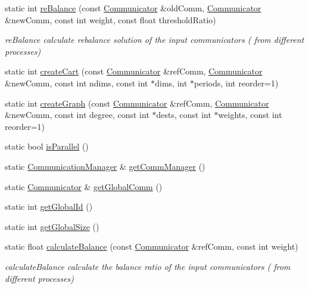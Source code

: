 \begin{DoxyCompactItemize}
static int \hyperlink{classHSF_1_1COMM_aaaf021a10daa5fbfa85102953a0d8f1c}{reBalance} (const \hyperlink{classHSF_1_1Communicator}{Communicator} \&oldComm, \hyperlink{classHSF_1_1Communicator}{Communicator} \&newComm, const int weight, const float thresholdRatio)
\begin{DoxyCompactList}\small\item\em reBalance calculate rebalance solution of the input communicators ( from different processes) \item\end{DoxyCompactList}\item 
static int \hyperlink{classHSF_1_1COMM_afcbab02e03ac7f6bce379be298c427de}{createCart} (const \hyperlink{classHSF_1_1Communicator}{Communicator} \&refComm, \hyperlink{classHSF_1_1Communicator}{Communicator} \&newComm, const int ndims, const int $\ast$dims, int $\ast$periods, int reorder=1)
\item 
static int \hyperlink{classHSF_1_1COMM_ae7d2271832dcd8690685d8ccbee84615}{createGraph} (const \hyperlink{classHSF_1_1Communicator}{Communicator} \&refComm, \hyperlink{classHSF_1_1Communicator}{Communicator} \&newComm, const int degree, const int $\ast$dests, const int $\ast$weights, const int reorder=1)
\item 
static bool \hyperlink{classHSF_1_1COMM_ad97b577f23c1a1f9f72d8d84b497e2c2}{isParallel} ()
\item 
static \hyperlink{classHSF_1_1CommunicationManager}{CommunicationManager} \& \hyperlink{classHSF_1_1COMM_a73b9e5bcef8100fa37a940c2dd744c7b}{getCommManager} ()
\item 
static \hyperlink{classHSF_1_1Communicator}{Communicator} \& \hyperlink{classHSF_1_1COMM_adae610b00b4c4cd966a0d19cdf5fc0e8}{getGlobalComm} ()
\item 
static int \hyperlink{classHSF_1_1COMM_a4c2a5c578e26fb2e53f8fad13f9e79ba}{getGlobalId} ()
\item 
static int \hyperlink{classHSF_1_1COMM_a454b84b21cd889f986a94fe0d51d43ee}{getGlobalSize} ()
\item 
static float \hyperlink{classHSF_1_1COMM_aab59c2848eee97f010d9b50c3d3881b4}{calculateBalance} (const \hyperlink{classHSF_1_1Communicator}{Communicator} \&refComm, const int weight)
\begin{DoxyCompactList}\small\item\em calculateBalance calculate the balance ratio of the input communicators ( from different processes) \item\end{DoxyCompactList}\item 

\end{DoxyCompactItemize}
